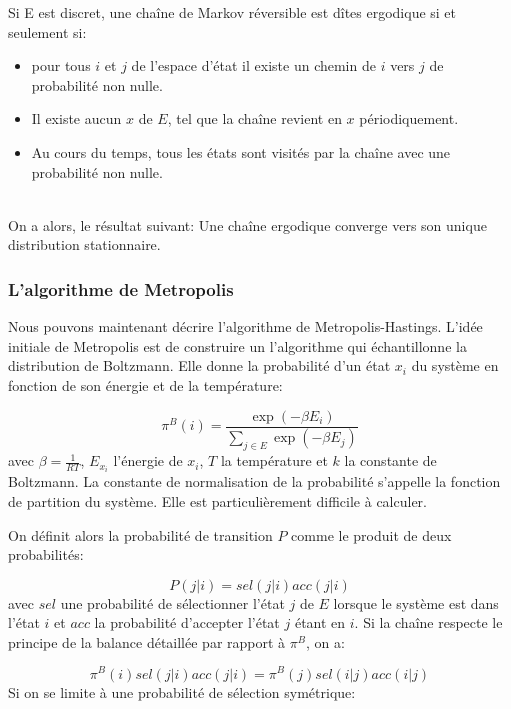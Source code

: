 Si E est discret, une chaîne de Markov réversible est dîtes ergodique si et seulement si:

\begin{itemize}
\item pour tous $i$ et $j$ de l'espace d'état il existe un chemin de $i$  vers $j$  de probabilité non nulle. 
\item Il existe aucun $x$ de $E$, tel que la chaîne revient en $x$ périodiquement.
\item  Au cours du temps, tous les états sont visités par la chaîne avec une probabilité non nulle. 
\end{itemize}\\
On a alors, le résultat suivant:
Une chaîne ergodique converge vers son unique distribution stationnaire.

\subsubsection{L'algorithme de Metropolis}

Nous pouvons maintenant décrire l'algorithme de Metropolis-Hastings. L'idée initiale de Metropolis est de construire un l'algorithme qui échantillonne la distribution de Boltzmann. Elle donne la probabilité d'un état $x_i$ du système en fonction de son énergie et de la température:

\begin{equation}
\pi^B(i) = \frac{\exp(-\beta E_i)}{\sum_{j \in E}\exp(-\beta E_j)} 
\end{equation}
avec $\beta = \frac{1}{RT}$, $E_{x_i}$  l'énergie de $x_i$, $T$ la température et $k$ la constante de Boltzmann. La constante de normalisation de la probabilité s'appelle la fonction de partition du système. Elle est particulièrement difficile à calculer.

On définit alors la probabilité de transition $P$ comme le produit de deux probabilités:

\begin{equation}
  \label{decomp_Metro}
P (j|i) = sel(j|i)acc(j|i)
\end{equation}
avec $sel$ une probabilité de sélectionner l'état $j$ de $E$ lorsque le système est dans l'état $i$ et $acc$ la probabilité d'accepter l'état $j$ étant en $i$. Si la chaîne respecte le principe de la balance détaillée par rapport à $\pi^B$, on a:

\begin{equation}
  \label{balance}
\pi^B(i)sel(j|i)acc(j|i) = \pi^B(j)sel(i|j)acc(i|j) 
\end{equation}
Si on se limite à une probabilité de sélection symétrique:

